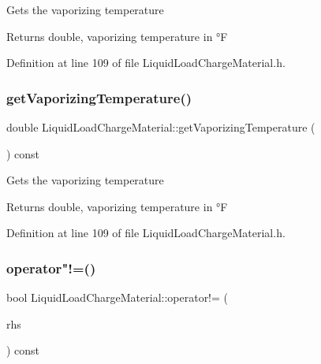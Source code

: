 Gets the vaporizing temperature \begin{DoxyReturn}{Returns}
double, vaporizing temperature in °F 
\end{DoxyReturn}


Definition at line 109 of file Liquid\+Load\+Charge\+Material.\+h.

\mbox{\label{class_liquid_load_charge_material_a07004e345fb4ff287d435d0c84027973}} 
\subsubsection{\texorpdfstring{get\+Vaporizing\+Temperature()}{getVaporizingTemperature()}\hspace{0.1cm}{\footnotesize\ttfamily [3/3]}}
{\footnotesize\ttfamily double Liquid\+Load\+Charge\+Material\+::get\+Vaporizing\+Temperature (\begin{DoxyParamCaption}{ }\end{DoxyParamCaption}) const\hspace{0.3cm}{\ttfamily [inline]}}

Gets the vaporizing temperature \begin{DoxyReturn}{Returns}
double, vaporizing temperature in °F 
\end{DoxyReturn}


Definition at line 109 of file Liquid\+Load\+Charge\+Material.\+h.

\mbox{\label{class_liquid_load_charge_material_aa6ad825ee8ab1c7816ce3bf10260c0bb}} 
\subsubsection{\texorpdfstring{operator"!=()}{operator!=()}\hspace{0.1cm}{\footnotesize\ttfamily [1/3]}}
{\footnotesize\ttfamily bool Liquid\+Load\+Charge\+Material\+::operator!= (\begin{DoxyParamCaption}\item[{const \hyperlink{class_liquid_load_charge_material}{Liquid\+Load\+Charge\+Material} \&}]{rhs }\end{DoxyParamCaption}) const\hspace{0.3cm}{\ttfamily [inline]}}


